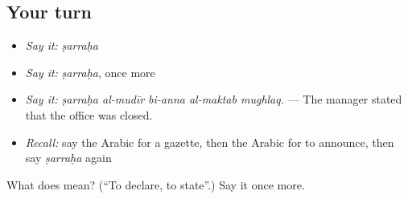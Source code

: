 \subsection*{Your turn}
\begin{itemize}
\raggedright
  \item \emph{Say it:} \emph{ṣarraḥa}
  \item \emph{Say it:} \emph{ṣarraḥa}, once more
  \item \emph{Say it:} \emph{ṣarraḥa al-mudīr bi-anna al-maktab mughlaq.} — The manager stated that the office was closed.
  \item \emph{Recall:} say the Arabic for a gazette, then the Arabic for to announce, then say \emph{ṣarraḥa} again
\end{itemize}

\begin{tcolorbox}[breakable,colback=teal!4,colframe=teal!35!black,title={Before you move on}]
What does  mean? (\textquotedblleft{}To declare, to state\textquotedblright{}.) Say it once more.
\end{tcolorbox}
